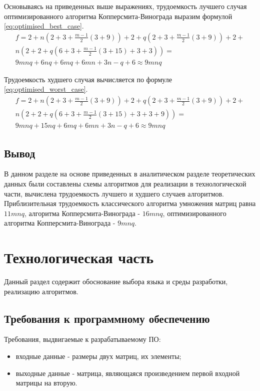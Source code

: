 \documentclass[12pt]{report}
\begin{document}
    Основываясь на приведенных выше выражениях, трудоемкость лучшего случая
    оптимизированного алгоритма Копперсмита-Винограда выразим формулой \ref{eq:optimised_best_case}.
    \begin{equation}
        \label{eq:optimised_best_case}
        \begin{array}{ll}
            f = 2 + n(2 + 3 + \frac{m-1}{2}(3 + 9)) + 2 + q(2 + 3 + \frac{m-1}{2}(3 + 9)) + 2 + \\
            n(2 + 2 + q(6 + 3 + \frac{m-1}{2}(3 + 15) + 3 + 3)) =                               \\
            9mnq + 6nq + 6mq + 6mn+3n-q+6 \approx 9mnq
        \end{array}
    \end{equation}

    Трудоемкость худшего случая вычисляется по формуле \ref{eq:optimised_worst_case}.
    \begin{equation}
        \label{eq:optimised_worst_case}
        \begin{array}{ll}
            f = 2 + n(2 + 3 + \frac{m-1}{2}(3 + 9)) + 2 + q(2 + 3 + \frac{m-1}{2}(3 + 9)) + 2 + \\
            n(2 + 2 + q(6 + 3 + \frac{m-1}{2}(3 + 15) + 3 + 3 + 9)) =                           \\
            9mnq+15nq+6mq+6mn+3n-q+6\approx 9mnq
        \end{array}
    \end{equation}


    \section{Вывод}
    В данном разделе на основе приведенных в аналитическом разделе теоретических данных
    были составлены схемы алгоритмов для реализации в технологической части,
    вычислена трудоемкость лучшего и худшего случаев алгоритмов.
    Приблизительная трудоемкость классического алгоритма умножения матриц равна $11mnq$,
    алгоритма Копперсмита-Винограда - $16mnq$,
    оптимизированного алгоритма Копперсмита-Винограда - $9mnq$.
    \newpage


    \chapter{Технологическая часть}
    Данный раздел содержит обоснование выбора языка и среды разработки, реализацию алгоритмов.


    \section{Требования к программному обеспечению}
    Требования, выдвигаемые к разрабатываемому ПО:
    \begin{itemize}
        \item входные данные - размеры двух матриц, их элементы;
        \item выходные данные - матрица, являющаяся произведением первой входной матрицы на вторую.
    \end{itemize}
\end{document}
